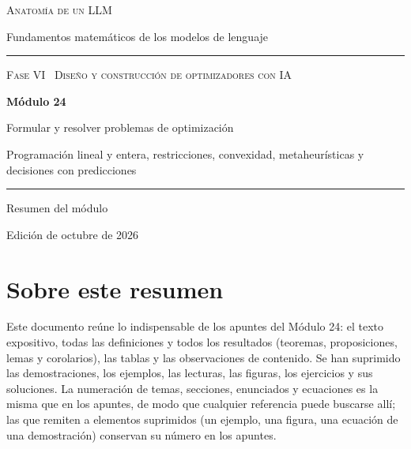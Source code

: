 \documentclass[11pt,a4paper,twoside,openany]{book}
\begin{document}
\frontmatter
\begin{titlepage}
\centering
\vspace*{2.5cm}
{\large\scshape Anatomía de un LLM}\par
\vspace{0.4cm}
{\normalsize Fundamentos matemáticos de los modelos de lenguaje}\par
\vspace{2.2cm}
\rule{\textwidth}{0.8pt}\par\vspace{0.5cm}
{\small\scshape Fase VI \textperiodcentered\ Diseño y construcción de optimizadores con IA}\par\vspace{0.3cm}
{\Huge\bfseries Módulo 24\par}\vspace{0.3cm}
{\LARGE Formular y resolver problemas de optimización\par}
\vspace{0.2cm}
{\large Programación lineal y entera, restricciones, convexidad, metaheurísticas y decisiones con predicciones\par}
\vspace{0.5cm}\rule{\textwidth}{0.4pt}\par
\vspace{1.6cm}
{\large Resumen del módulo}\par
\vfill
{\small Edición de octubre de 2026}\par
\end{titlepage}

\chapter*{Sobre este resumen}

Este documento reúne lo indispensable de los apuntes del Módulo 24: el texto expositivo, todas las definiciones y todos los resultados (teoremas, proposiciones, lemas y corolarios), las tablas y las observaciones de contenido. Se han suprimido las demostraciones, los ejemplos, las lecturas, las figuras, los ejercicios y sus soluciones. La numeración de temas, secciones, enunciados y ecuaciones es la misma que en los apuntes, de modo que cualquier referencia puede buscarse allí; las que remiten a elementos suprimidos (un ejemplo, una figura, una ecuación de una demostración) conservan su número en los apuntes.
\end{document}
